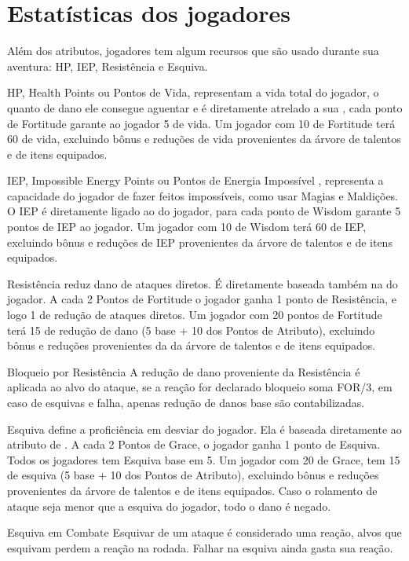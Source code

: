 \section*{Estatísticas dos jogadores}

Além dos atributos, jogadores tem algum recursos que são usado durante sua aventura: HP, IEP, Resistência e Esquiva.

HP, Health Points ou Pontos de Vida, representam a vida total do jogador, o quanto de dano ele consegue aguentar e é diretamente atrelado a sua , cada ponto de Fortitude garante ao jogador 5 de vida. Um jogador com 10 de Fortitude terá 60 de vida, excluindo bônus e reduções de vida provenientes da árvore de talentos e de itens equipados.

IEP, Impossible Energy Points ou Pontos de Energia Impossível , representa a capacidade do jogador de fazer feitos impossíveis, como usar Magias e Maldições. O IEP é diretamente ligado ao  do jogador, para cada ponto de Wisdom garante 5 pontos de IEP ao jogador. Um jogador com 10 de Wisdom terá 60 de IEP, excluindo bônus e reduções de IEP provenientes da árvore de talentos e de itens equipados.

Resistência reduz dano de ataques diretos. É diretamente baseada também na  do jogador. A cada 2 Pontos de Fortitude o jogador ganha 1 ponto de Resistência, e logo 1 de redução de ataques diretos. Um jogador com 20 pontos de Fortitude terá 15 de redução de dano (5 base + 10 dos Pontos de Atributo), excluindo bônus e reduções provenientes da da árvore de talentos e de itens equipados.

\begin{rpgboxtips}{Bloqueio por Resistência}
A redução de dano proveniente da Resistência é aplicada ao alvo do ataque, se a reação for declarado bloqueio soma FOR/3, em caso de esquivas e falha, apenas redução de danos base são contabilizadas.
\end{rpgboxtips}

Esquiva define a proficiência em desviar do jogador. Ela é baseada diretamente ao atributo de . A cada 2 Pontos de Grace, o jogador ganha 1 ponto de Esquiva. Todos os jogadores tem Esquiva base em 5. Um jogador com 20 de Grace, tem 15 de esquiva (5 base + 10 dos Pontos de Atributo), excluindo bônus e reduções provenientes da árvore de talentos e de itens equipados. Caso o rolamento de ataque seja menor que a esquiva do jogador, todo o dano é negado.

\begin{rpgboxtips}{Esquiva em Combate}
Esquivar de um ataque é considerado uma reação, alvos que esquivam perdem a reação na rodada. Falhar na esquiva ainda gasta sua reação.
\end{rpgboxtips}